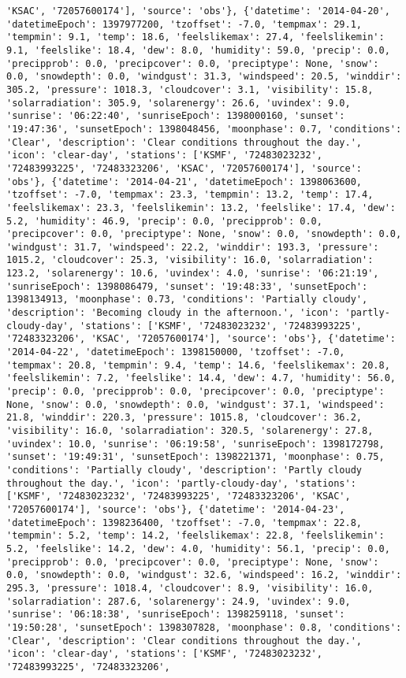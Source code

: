 \documentclass[
  letterpaper,
  DIV=11,
  numbers=noendperiod]{scrartcl}
\begin{document}
\begin{verbatim}
'KSAC', '72057600174'], 'source': 'obs'}, {'datetime': '2014-04-20', 'datetimeEpoch': 1397977200, 'tzoffset': -7.0, 'tempmax': 29.1, 'tempmin': 9.1, 'temp': 18.6, 'feelslikemax': 27.4, 'feelslikemin': 9.1, 'feelslike': 18.4, 'dew': 8.0, 'humidity': 59.0, 'precip': 0.0, 'precipprob': 0.0, 'precipcover': 0.0, 'preciptype': None, 'snow': 0.0, 'snowdepth': 0.0, 'windgust': 31.3, 'windspeed': 20.5, 'winddir': 305.2, 'pressure': 1018.3, 'cloudcover': 3.1, 'visibility': 15.8, 'solarradiation': 305.9, 'solarenergy': 26.6, 'uvindex': 9.0, 'sunrise': '06:22:40', 'sunriseEpoch': 1398000160, 'sunset': '19:47:36', 'sunsetEpoch': 1398048456, 'moonphase': 0.7, 'conditions': 'Clear', 'description': 'Clear conditions throughout the day.', 'icon': 'clear-day', 'stations': ['KSMF', '72483023232', '72483993225', '72483323206', 'KSAC', '72057600174'], 'source': 'obs'}, {'datetime': '2014-04-21', 'datetimeEpoch': 1398063600, 'tzoffset': -7.0, 'tempmax': 23.3, 'tempmin': 13.2, 'temp': 17.4, 'feelslikemax': 23.3, 'feelslikemin': 13.2, 'feelslike': 17.4, 'dew': 5.2, 'humidity': 46.9, 'precip': 0.0, 'precipprob': 0.0, 'precipcover': 0.0, 'preciptype': None, 'snow': 0.0, 'snowdepth': 0.0, 'windgust': 31.7, 'windspeed': 22.2, 'winddir': 193.3, 'pressure': 1015.2, 'cloudcover': 25.3, 'visibility': 16.0, 'solarradiation': 123.2, 'solarenergy': 10.6, 'uvindex': 4.0, 'sunrise': '06:21:19', 'sunriseEpoch': 1398086479, 'sunset': '19:48:33', 'sunsetEpoch': 1398134913, 'moonphase': 0.73, 'conditions': 'Partially cloudy', 'description': 'Becoming cloudy in the afternoon.', 'icon': 'partly-cloudy-day', 'stations': ['KSMF', '72483023232', '72483993225', '72483323206', 'KSAC', '72057600174'], 'source': 'obs'}, {'datetime': '2014-04-22', 'datetimeEpoch': 1398150000, 'tzoffset': -7.0, 'tempmax': 20.8, 'tempmin': 9.4, 'temp': 14.6, 'feelslikemax': 20.8, 'feelslikemin': 7.2, 'feelslike': 14.4, 'dew': 4.7, 'humidity': 56.0, 'precip': 0.0, 'precipprob': 0.0, 'precipcover': 0.0, 'preciptype': None, 'snow': 0.0, 'snowdepth': 0.0, 'windgust': 37.1, 'windspeed': 21.8, 'winddir': 220.3, 'pressure': 1015.8, 'cloudcover': 36.2, 'visibility': 16.0, 'solarradiation': 320.5, 'solarenergy': 27.8, 'uvindex': 10.0, 'sunrise': '06:19:58', 'sunriseEpoch': 1398172798, 'sunset': '19:49:31', 'sunsetEpoch': 1398221371, 'moonphase': 0.75, 'conditions': 'Partially cloudy', 'description': 'Partly cloudy throughout the day.', 'icon': 'partly-cloudy-day', 'stations': ['KSMF', '72483023232', '72483993225', '72483323206', 'KSAC', '72057600174'], 'source': 'obs'}, {'datetime': '2014-04-23', 'datetimeEpoch': 1398236400, 'tzoffset': -7.0, 'tempmax': 22.8, 'tempmin': 5.2, 'temp': 14.2, 'feelslikemax': 22.8, 'feelslikemin': 5.2, 'feelslike': 14.2, 'dew': 4.0, 'humidity': 56.1, 'precip': 0.0, 'precipprob': 0.0, 'precipcover': 0.0, 'preciptype': None, 'snow': 0.0, 'snowdepth': 0.0, 'windgust': 32.6, 'windspeed': 16.2, 'winddir': 295.3, 'pressure': 1018.4, 'cloudcover': 8.9, 'visibility': 16.0, 'solarradiation': 287.6, 'solarenergy': 24.9, 'uvindex': 9.0, 'sunrise': '06:18:38', 'sunriseEpoch': 1398259118, 'sunset': '19:50:28', 'sunsetEpoch': 1398307828, 'moonphase': 0.8, 'conditions': 'Clear', 'description': 'Clear conditions throughout the day.', 'icon': 'clear-day', 'stations': ['KSMF', '72483023232', '72483993225', '72483323206', 
\end{verbatim}
\end{document}
